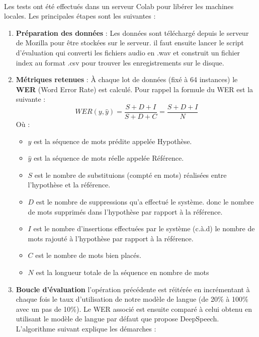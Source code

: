 	\paragraph{}
	Les tests ont été effectués dans un serveur Colab pour libérer les machines locales. Les principales étapes sont les suivantes :  
	\begin{enumerate}
		\item \textbf{Préparation des données} : Les données sont téléchargé depuis le serveur de Mozilla pour être stockées sur le serveur. il faut ensuite lancer le script d'évaluation qui converti les fichiers audio en .wav et construit un fichier index au format .csv pour trouver les enregistrements sur le disque.
		\item \textbf{Métriques retenues} : À chaque lot de données (fixé à 64 instances) le \textbf{WER} (Word Error Rate) est calculé. Pour rappel la formule du WER est la suivante :
		\begin{equation*}
			WER(y,\hat{y}) = \frac{S+D+I}{S+D+C} = \frac{S+D+I}{N}
		\end{equation*}
		Où : 
		\begin{itemize}
			\item $y$ est la séquence de mots prédite appelée Hypothèse.
			\item $\hat{y}$ est la séquence de mots réelle appelée Référence.
			\item $S$ est le nombre de substituions (compté en mots) réalisées entre l'hypothèse et la référence.
			\item $D$ est le nombre de suppressions qu'a effectué le système. donc le nombre de mots supprimés dans l'hypothèse par rapport à la référence.
			\item $I$ est le nombre d'insertions effectuées par le système (c.à.d) le nombre de mots rajouté à l'hypothèse par rapport à la référence.
			\item $C$ est le nombre de mots bien placés.
			\item $N$ est la longueur totale de la séquence en nombre de mots
		\end{itemize}
		\item \textbf{Boucle d'évaluation} l'opération précédente est réitérée en incrémentant à chaque fois le taux d'utilisation de notre modèle de langue (de 20\% à 100\% avec un pas de 10\%). Le WER associé est ensuite comparé à celui obtenu en utilisant le modèle de langue par défaut que propose DeepSpeech. L'algorithme suivant explique les démarches :
	\end{enumerate}
